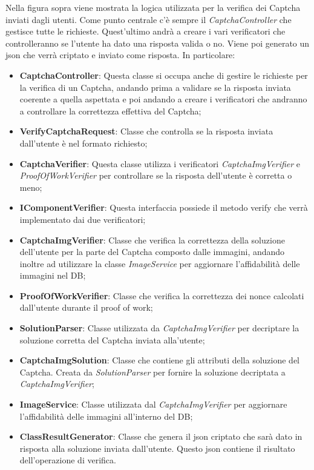 Nella figura sopra viene mostrata la logica utilizzata per la verifica dei Captcha inviati dagli utenti. Come punto centrale c'è sempre il \textit{CaptchaController} che gestisce tutte le richieste. Quest'ultimo andrà a creare i vari verificatori che controlleranno se l'utente ha dato una risposta valida o no. Viene poi generato un json che verrà criptato e inviato come risposta.
In particolare:
\begin{itemize}
	\item \textbf{CaptchaController}: Questa classe si occupa anche di gestire le richieste per la verifica di un Captcha, andando prima a validare se la risposta inviata coerente a quella aspettata e poi andando a creare i verificatori che andranno a controllare la correttezza effettiva del Captcha;
	\item \textbf{VerifyCaptchaRequest}: Classe che controlla se la risposta inviata dall'utente è nel formato richiesto;
	\item \textbf{CaptchaVerifier}: Questa classe utilizza i verificatori \textit{CaptchaImgVerifier} e \textit{ProofOfWorkVerifier} per controllare se la risposta dell'utente è corretta o meno;
	\item \textbf{IComponentVerifier}: Questa interfaccia possiede il metodo verify che verrà implementato dai due verificatori; 
	\item \textbf{CaptchaImgVerifier}: Classe che verifica la correttezza della soluzione dell'utente per la parte del Captcha composto dalle immagini, andando inoltre ad utilizzare la classe \textit{ImageService} per aggiornare l'affidabilità delle immagini nel DB;
	\item \textbf{ProofOfWorkVerifier}: Classe che verifica la correttezza dei nonce calcolati dall'utente durante il proof of work;
	\item \textbf{SolutionParser}: Classe utilizzata da \textit{CaptchaImgVerifier} per decriptare la soluzione corretta del Captcha inviata alla'utente;
	\item \textbf{CaptchaImgSolution}: Classe che contiene gli attributi della soluzione del Captcha. Creata da \textit{SolutionParser} per fornire la soluzione decriptata a \textit{CaptchaImgVerifier};
	\item \textbf{ImageService}: Classe utilizzata dal \textit{CaptchaImgVerifier} per aggiornare l'affidabilità delle immagini all'interno del DB;
	\item \textbf{ClassResultGenerator}: Classe che genera il json criptato che sarà dato in risposta alla soluzione inviata dall'utente. Questo json contiene il risultato dell'operazione di verifica.
\end{itemize}

